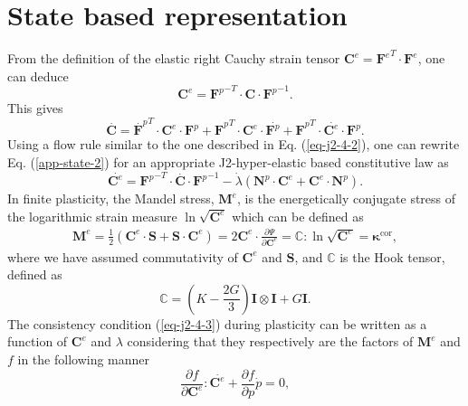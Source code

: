 \chapter{State based representation}\label{app-state}
From the definition of the elastic right Cauchy strain tensor $ \textbf{C}^e={\textbf{F}^e}^T\cdot\textbf{F}^e $, one can deduce
\begin{equation}\label{app-state-1}
\textbf{C}^e={\textbf{F}^p}^{-T}\cdot\textbf{C}\cdot{\textbf{F}^p}^{-1}.
\end{equation}
This gives
\begin{equation}\label{app-state-2}
\overset{.}{\textbf{C}}={\overset{.}{\textbf{F}}^p}^T\cdot\textbf{C}^e\cdot\textbf{F}^p+{\overset{}{\textbf{F}}^p}^T\cdot\textbf{C}^e\cdot\overset{.}{\textbf{F}^p}+{\overset{}{\textbf{F}}^p}^T\cdot\overset{.}{\textbf{C}^e}\cdot\overset{}{\textbf{F}^p}.
\end{equation}
Using a flow rule similar to the one described in Eq. (\ref{eq-j2-4-2}), one can rewrite Eq. (\ref{app-state-2}) for an appropriate J2-hyper-elastic based constitutive law as
\begin{equation}\label{app-state-3}
\overset{.}{\textbf{C}^e}={\textbf{F}^p}^{-T}\cdot\overset{.}{\textbf{C}}\cdot{\textbf{F}^p}^{-1}-\dot\lambda(\textbf{N}^p\cdot\textbf{C}^e+\textbf{C}^e\cdot\textbf{N}^p).
\end{equation}
In finite plasticity, the Mandel stress, $ \textbf{M}^e $, is the energetically conjugate stress of the logarithmic strain measure $ \ln\sqrt{\textbf{C}^e} $ which can be defined as 
\begin{eqnarray}\label{app-state-4}
\textbf{M}^e = \frac{1}{2}(\textbf{C}^e\cdot\textbf{S}+\textbf{S}\cdot\textbf{C}^e)= 2\textbf{C}^e\cdot\frac{\partial\Psi}{\partial\textbf{C}^e} = \mathbb{C}:\ln\sqrt{\textbf{C}^e}=\bm\kappa^\text{cor},
\end{eqnarray}
where we have assumed commutativity of $ \textbf{C}^e $ and $ \textbf{S} $, and $ \mathbb{C} $ is the Hook tensor, defined as
\begin{equation}\label{app-state-4-1}
\mathbb{C}=\left(K-\frac{2G}{3}\right)\textbf{I}\otimes\textbf{I}+G\textbf{I}.
\end{equation}
The consistency condition (\ref{eq-j2-4-3}) during plasticity can be written as a function of $ \textbf{C}^e $ and  $ \lambda $ considering that they respectively are the factors of $ \textbf{M}^e $ and $ f $ in the following manner
\begin{equation}\label{app-state-5}
\frac{\partial f}{\partial \textbf{C}^e}:\overset{.}{\textbf{C}^e}+\frac{\partial f}{\partial p}\dot{p}=0,
\end{equation}
